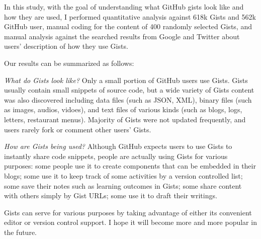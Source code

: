 In this study, with the goal of understanding what GitHub gists look like and how they are used, I performed quantitative analysis against 618k Gists and 562k GitHub user, manual coding for the content of 400 randomly selected Gists, and manual analysis against the searched results from Google and Twitter about users' description of how they use Gists. 

Our results can be summarized as follows:

\textsl{What do Gists look like?} Only a small portion of GitHub users use Gists. Gists usually contain small snippets of source code, but a wide variety of Gists content was also discovered including data files (such as JSON, XML), binary files (such as images, audios, vidoes), and text files of various kinds (such as blogs, logs, letters, restaurant menus). Majority of Gists were not updated frequently, and users rarely fork or comment other users' Gists.

\textsl{How are Gists being used?} Although GitHub expects users to use Gists to instantly share code snippets, people are actually using Gists for various purposes: some people use it to create components that can be embedded in their blogs; some use it to keep track of some activities by a version controlled list; some save their notes such as learning outcomes in Gists; some share content with others simply by Gist URLs; some use it to draft their writings.

Gists can serve for various purposes by taking advantage of either its convenient editor or version control support. I hope it will become more and more popular in the future.